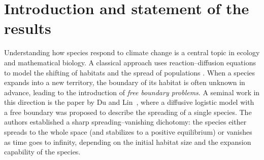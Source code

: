 \documentclass[reqno]{amsart}
\theoremstyle{plain}
\theoremstyle{definition}
\theoremstyle{remark}
\begin{document}
	
	
	\dedicatory{}
	
	
	\maketitle
	
	\section{Introduction and statement of the results}\label{sec_1}
	
	Understanding how species respond to climate change is a central topic in ecology and mathematical biology. A classical approach uses reaction–diffusion equations to model the shifting of habitats and the spread of populations \cite{MR2471053,MR3377515,MR3691993}. When a species expands into a new territory, the boundary of its habitat is often unknown in advance, leading to the introduction of \emph{free boundary problems}. A seminal work in this direction is the paper by Du and Lin~\cite{MR2607347}, where a diffusive logistic model with a free boundary was proposed to describe the spreading of a single species. The authors established a sharp spreading–vanishing dichotomy: the species either spreads to the whole space (and stabilizes to a positive equilibrium) or vanishes as time goes to infinity, depending on the initial habitat size and the expansion capability of the species.
	
\end{document}
